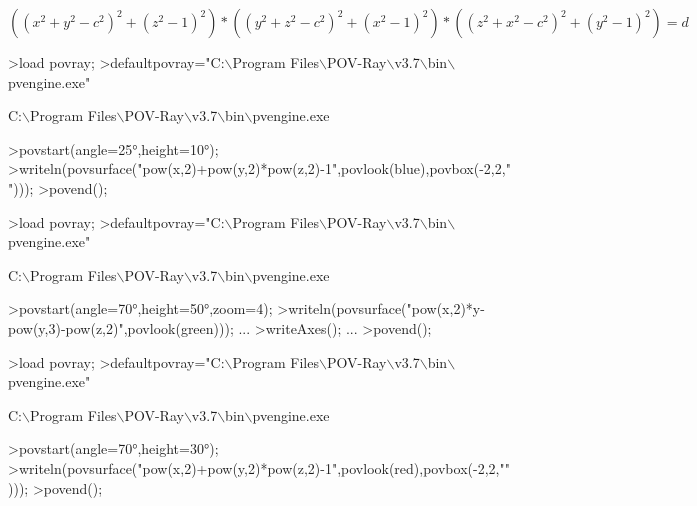 \documentclass[a4paper,10pt]{article}
\begin{document}
\begin{eulernotebook}
\begin{eulercomment}
\end{eulercomment}
\begin{eulerformula}
\[
((x^2+y^2-c^2)^2+(z^2-1)^2)*((y^2+z^2-c^2)^2+(x^2-1)^2)*((z^2+x^2-c^2)^2+(y^2-1)^2)=d
\]
\end{eulerformula}
\begin{eulerprompt}
>load povray;
>defaultpovray="C:\(\backslash\)Program Files\(\backslash\)POV-Ray\(\backslash\)v3.7\(\backslash\)bin\(\backslash\)pvengine.exe"
\end{eulerprompt}
\begin{euleroutput}
  C:\(\backslash\)Program Files\(\backslash\)POV-Ray\(\backslash\)v3.7\(\backslash\)bin\(\backslash\)pvengine.exe
\end{euleroutput}
\begin{eulerprompt}
>povstart(angle=25°,height=10°);
>writeln(povsurface("pow(x,2)+pow(y,2)*pow(z,2)-1",povlook(blue),povbox(-2,2,"")));
>povend();
\end{eulerprompt}
\begin{eulerprompt}
>load povray;
>defaultpovray="C:\(\backslash\)Program Files\(\backslash\)POV-Ray\(\backslash\)v3.7\(\backslash\)bin\(\backslash\)pvengine.exe"
\end{eulerprompt}
\begin{euleroutput}
  C:\(\backslash\)Program Files\(\backslash\)POV-Ray\(\backslash\)v3.7\(\backslash\)bin\(\backslash\)pvengine.exe
\end{euleroutput}
\begin{eulerprompt}
>povstart(angle=70°,height=50°,zoom=4);
>writeln(povsurface("pow(x,2)*y-pow(y,3)-pow(z,2)",povlook(green))); ...
>writeAxes(); ...
>povend();
\end{eulerprompt}
\begin{eulerprompt}
>load povray;
>defaultpovray="C:\(\backslash\)Program Files\(\backslash\)POV-Ray\(\backslash\)v3.7\(\backslash\)bin\(\backslash\)pvengine.exe"
\end{eulerprompt}
\begin{euleroutput}
  C:\(\backslash\)Program Files\(\backslash\)POV-Ray\(\backslash\)v3.7\(\backslash\)bin\(\backslash\)pvengine.exe
\end{euleroutput}
\begin{eulerprompt}
>povstart(angle=70°,height=30°);
>writeln(povsurface("pow(x,2)+pow(y,2)*pow(z,2)-1",povlook(red),povbox(-2,2,"")));
>povend();
\end{eulerprompt}

\end{eulernotebook}
\end{document}
